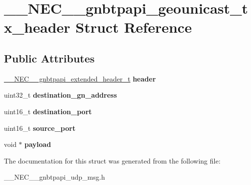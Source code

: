 \hypertarget{struct____NEC____gnbtpapi__geounicast__tx__header}{\section{\-\_\-\-\_\-\-N\-E\-C\-\_\-\-\_\-gnbtpapi\-\_\-geounicast\-\_\-tx\-\_\-header \-Struct \-Reference}
\label{struct____NEC____gnbtpapi__geounicast__tx__header}
}
\subsection*{\-Public \-Attributes}
\begin{DoxyCompactItemize}
\item 
\hypertarget{struct____NEC____gnbtpapi__geounicast__tx__header_ad1ca92d85c907ab7b016bbd94d65af81}{\hyperlink{struct____NEC____gnbtpapi__extended__header}{\-\_\-\-\_\-\-N\-E\-C\-\_\-\-\_\-gnbtpapi\-\_\-extended\-\_\-header\-\_\-t} {\bfseries header}}\label{struct____NEC____gnbtpapi__geounicast__tx__header_ad1ca92d85c907ab7b016bbd94d65af81}

\item 
\hypertarget{struct____NEC____gnbtpapi__geounicast__tx__header_ab842932b01da92e89b3b2b0b7855c565}{uint32\-\_\-t {\bfseries destination\-\_\-gn\-\_\-address}}\label{struct____NEC____gnbtpapi__geounicast__tx__header_ab842932b01da92e89b3b2b0b7855c565}

\item 
\hypertarget{struct____NEC____gnbtpapi__geounicast__tx__header_a43d020e9ffff860c8692e91a7e260fc2}{uint16\-\_\-t {\bfseries destination\-\_\-port}}\label{struct____NEC____gnbtpapi__geounicast__tx__header_a43d020e9ffff860c8692e91a7e260fc2}

\item 
\hypertarget{struct____NEC____gnbtpapi__geounicast__tx__header_ac802d5197964d81652c69c8d044a5739}{uint16\-\_\-t {\bfseries source\-\_\-port}}\label{struct____NEC____gnbtpapi__geounicast__tx__header_ac802d5197964d81652c69c8d044a5739}

\item 
\hypertarget{struct____NEC____gnbtpapi__geounicast__tx__header_ac7cb8080cc28c8ae7ce46b97f9acd0c1}{void $\ast$ {\bfseries payload}}\label{struct____NEC____gnbtpapi__geounicast__tx__header_ac7cb8080cc28c8ae7ce46b97f9acd0c1}

\end{DoxyCompactItemize}


\-The documentation for this struct was generated from the following file\-:\begin{DoxyCompactItemize}
\item 
\-\_\-\-\_\-\-N\-E\-C\-\_\-\-\_\-gnbtpapi\-\_\-udp\-\_\-msg.\-h\end{DoxyCompactItemize}
